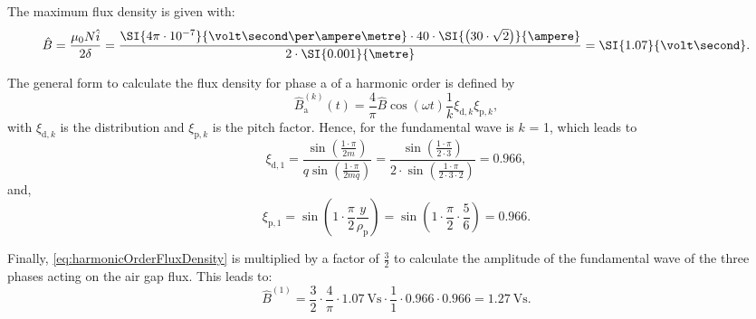 \begin{solutionblock}
    The maximum flux density is given with:
    \begin{equation}
        \hat{B} = \frac{\mu_{\mathrm{0}}N \hat{i}}{2 \delta}
        = \frac{\SI{4\pi\cdot10^{-7}}{\volt\second\per\ampere\metre}\cdot 40 \cdot \SI{\left(30\cdot \sqrt{2} \right)}{\ampere}}{2\cdot \SI{0.001}{\metre}}
        = \SI{1.07}{\volt\second}.
    \end{equation}

    The general form to calculate the flux density for phase a of a harmonic order is defined by
    \begin{equation}
        \hat{B}_{\mathrm{a}}^{(k)}(t) = \frac{4}{\pi} \hat{B} \cos(\omega t) \frac{1}{k} \xi_{\mathrm{d,}k} \xi_{\mathrm{p,}k},
        \label{eq:harmonicOrderFluxDensity}
    \end{equation}
    with $\xi_{\mathrm{d,}k}$ is the distribution and $\xi_{\mathrm{p,}k}$ is the pitch factor. Hence, for the fundamental wave is $k$ = 1, which leads to
    \begin{equation}
        \xi_{\mathrm{d,}1} = \frac{\sin\left( \frac{1\cdot \pi}{2m}\right)}{q\sin\left(\frac{1\cdot\pi}{2mq}\right)}
        = \frac{\sin\left(\frac{1\cdot\pi}{2\cdot3}\right)}{2\cdot \sin\left(\frac{1\cdot\pi}{2\cdot3\cdot2}\right)}
        = 0.966,
        \label{eq:distributionFactor}
    \end{equation}
    and,
    \begin{equation}
        \xi_{\mathrm{p,}1} = \sin\left(1\cdot \frac{\pi}{2} \frac{y}{\rho_{\mathrm{p}}} \right)
        = \sin\left(1 \cdot \frac{\pi}{2} \cdot \frac{5}{6} \right)
        = 0.966.
        \label{eq:pitchFactor}
    \end{equation}

    Finally, \eqref{eq:harmonicOrderFluxDensity} is multiplied by a factor of $\frac{3}{2}$ to calculate the amplitude of the fundamental wave of the three phases acting on the air gap flux. This leads to:
    \begin{equation}
        \hat{B}^{(1)} = \frac{3}{2}\cdot\frac{4}{\pi} \cdot \SI{1.07}{\volt\second} \cdot \frac{1}{1} \cdot 0.966 \cdot 0.966
        = \SI{1.27}{\volt\second}.
        \label{eq:Fourier_threePhases}
    \end{equation}

\end{solutionblock}



